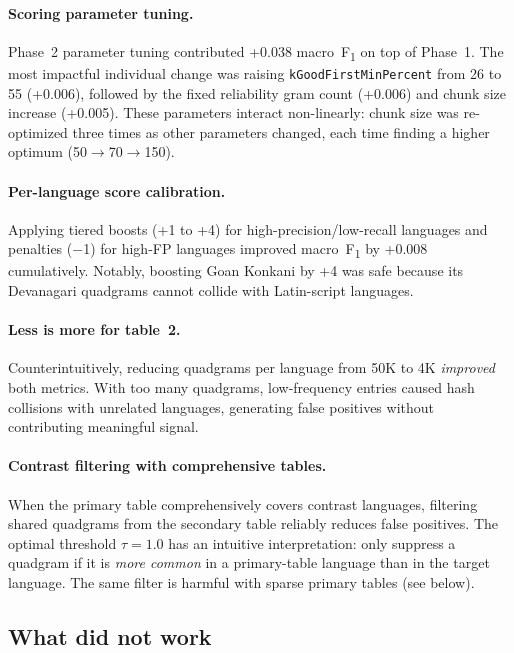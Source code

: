 \documentclass{article}
\newcommand{\fone}{F\textsubscript{1}}
\begin{document}
\paragraph{Scoring parameter tuning.}
Phase~2 parameter tuning contributed +0.038 macro~\fone{} on top of Phase~1.
The most impactful individual change was raising \texttt{kGoodFirstMinPercent} from 26 to 55 (+0.006), followed by the fixed reliability gram count (+0.006) and chunk size increase (+0.005).
These parameters interact non-linearly: chunk size was re-optimized three times as other parameters changed, each time finding a higher optimum (50$\to$70$\to$150).

\paragraph{Per-language score calibration.}
Applying tiered boosts (+1 to +4) for high-precision/low-recall languages and penalties ($-$1) for high-FP languages improved macro~\fone{} by +0.008 cumulatively.
Notably, boosting Goan Konkani by +4 was safe because its Devanagari quadgrams cannot collide with Latin-script languages.

\paragraph{Less is more for table~2.}
Counterintuitively, reducing quadgrams per language from 50K to 4K \emph{improved} both metrics.
With too many quadgrams, low-frequency entries caused hash collisions with unrelated languages, generating false positives without contributing meaningful signal.

\paragraph{Contrast filtering with comprehensive tables.}
When the primary table comprehensively covers contrast languages, filtering shared quadgrams from the secondary table reliably reduces false positives.
The optimal threshold $\tau{=}1.0$ has an intuitive interpretation: only suppress a quadgram if it is \emph{more common} in a primary-table language than in the target language.
The same filter is harmful with sparse primary tables (see below).

\subsection{What did not work}
\label{sec:didntwork}
\end{document}
